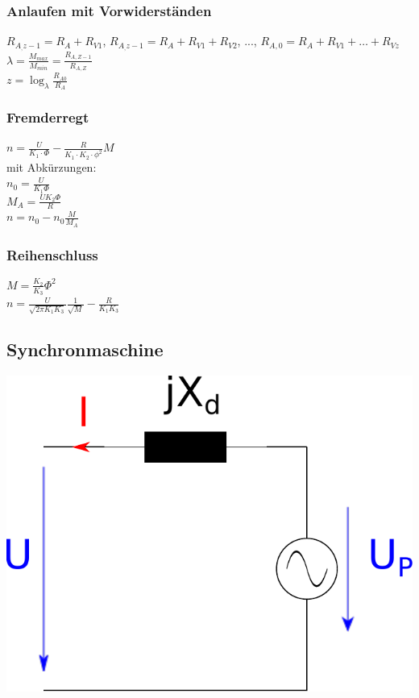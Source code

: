\documentclass[european]{latex4ei_sheet}
\begin{document}
		\subsubsection{Anlaufen mit Vorwiderständen}
		$R_{A_,z-1} = R_A + R_{V1}$, $R_{A_,z-1} = R_A + R_{V1} + R_{V2}$, ..., $R_{A,0} = R_A + R_{V1} + \hdots + R_{Vz}$ \\
		$\lambda = \frac{M_{max}}{M_{min}} = \frac{R_{A,Z-1}}{R_{A,Z}}$ \\
		$ z = \log_\lambda \frac{R_{A0}}{R_A}$
		
		
		\subsubsection{Fremderregt}
		$n = \frac{U}{ K_1 \cdot \Phi} - \frac{R}{K_1 \cdot K_2 \cdot \phi^2}M$\\

		mit Abkürzungen: \\
		$n_0 = \frac{U}{K_1 \Phi}$ \\
		$M_A = \frac{U K_2 \Phi}{R}$ \\
		$n = n_0 - n_0 \frac{M}{M_A}$
		
		
		\subsubsection{Reihenschluss}
		$M = \frac{K_2}{K_3} \Phi^2$ \\
		$n = \frac{U}{\sqrt{2 \pi K_1 K_3}} \frac{1}{\sqrt{M}} - \frac{R}{K_1 K_3}$
		
		
		\subsection{Synchronmaschine}
		
		\begin{center}
		\includegraphics[scale=.2]{./img/ersatzschaltbild_synchronmaschine.pdf}
		\end{center}
		
\end{document}
